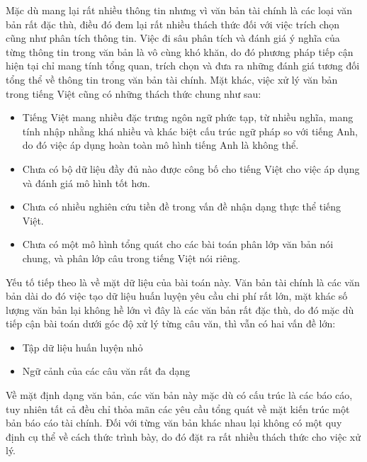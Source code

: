 \documentclass[14pt]{extreport}
\begin{document}
Mặc dù mang lại rất nhiều thông tin nhưng vì văn bản tài chính là các loại văn bản rất đặc thù, điều đó đem lại rất nhiều thách thức đối với việc trích chọn cũng như phân tích thông tin. Việc đi sâu phân tích và đánh giá ý nghĩa của từng thông tin trong văn bản là vô cùng khó khăn, do đó phương pháp tiếp cận hiện tại chỉ mang tính tổng quan, trích chọn và đưa ra những đánh giá tương đối tổng thể về thông tin trong văn bản tài chính. Mặt khác, việc xử lý văn bản trong tiếng Việt cũng có những thách thức chung như sau:
\begin{itemize}
    \item Tiếng Việt mang nhiều đặc trưng ngôn ngữ phức tạp, từ nhiều nghĩa, mang tính nhập nhằng khá nhiều và khác biệt cấu trúc ngữ pháp so với tiếng Anh, do đó việc áp dụng hoàn toàn mô hình tiếng Anh là không thể. 
    \item Chưa có bộ dữ liệu đầy đủ nào được công bố cho tiếng Việt cho việc áp dụng và đánh giá mô hình tốt hơn.
    \item Chưa có nhiều nghiên cứu tiền đề trong vấn đề nhận dạng thực thể tiếng Việt.
    \item Chưa có một mô hình tổng quát cho các bài toán phân lớp văn bản nói chung, và phân lớp câu trong tiếng Việt nói riêng.
\end{itemize}
Yếu tố tiếp theo là về mặt dữ liệu của bài toán này. Văn bản tài chính là các văn bản dài do đó việc tạo dữ liệu huấn luyện yêu cầu chi phí rất lớn, mặt khác số lượng văn bản lại không hề lớn vì đây là các văn bản rất đặc thù, do đó mặc dù tiếp cận bài toán dưới góc độ xử lý từng câu văn, thì vẫn có hai vấn đề lớn:
\begin{itemize}
    \item Tập dữ liệu huấn luyện nhỏ
    \item Ngữ cảnh của các câu văn rất đa dạng
\end{itemize}
Về mặt định dạng văn bản, các văn bản này mặc dù có cấu trúc là các báo cáo, tuy nhiên tất cả đều chỉ thỏa mãn các yêu cầu tổng quát về mặt kiến trúc một bản báo cáo tài chính. Đối với từng văn bản khác nhau lại không có một quy định cụ thể về cách thức trình bày, do đó đặt ra rất nhiều thách thức cho việc xử lý.
 
\end{document}
